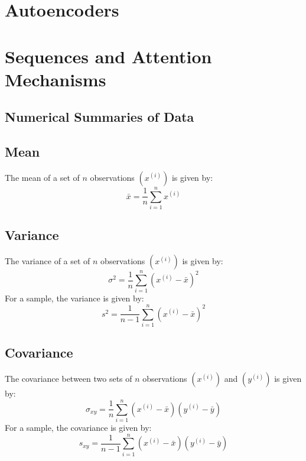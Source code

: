 \documentclass{article}
\begin{document}
\section{Autoencoders}
\section{Sequences and Attention Mechanisms}
\newpage
\begin{appendix}
    \section{Numerical Summaries of Data}\label{appendix:numerical-summaries}
    \subsection{Mean}
    The mean of a set of \(n\) observations \(\left( x^{\left( i
    \right)} \right)\) is given by:
    \begin{equation*}
        \bar{x} = \frac{1}{n} \sum_{i = 1}^n x^{\left( i \right)}
    \end{equation*}
    \subsection{Variance}
    The variance of a set of \(n\) observations \(\left( x^{\left( i
    \right)} \right)\) is given by:
    \begin{equation*}
        \sigma^2 = \frac{1}{n} \sum_{i = 1}^n {\left( x^{\left( i \right)} - \bar{x} \right)}^2
    \end{equation*}
    For a sample, the variance is given by:
    \begin{equation*}
        s^2 = \frac{1}{n - 1} \sum_{i = 1}^n {\left( x^{\left( i \right)} - \bar{x} \right)}^2
    \end{equation*}
    \subsection{Covariance}
    The covariance between two sets of \(n\) observations \(\left(
    x^{\left( i \right)} \right)\) and \(\left( y^{\left( i \right)}
    \right)\) is given by:
    \begin{equation*}
        \sigma_{xy} = \frac{1}{n} \sum_{i = 1}^n \left( x^{\left( i \right)} - \bar{x} \right) \left( y^{\left( i \right)} - \bar{y} \right)
    \end{equation*}
    For a sample, the covariance is given by:
    \begin{equation*}
        s_{xy} = \frac{1}{n - 1} \sum_{i = 1}^n \left( x^{\left( i \right)} - \bar{x} \right) \left( y^{\left( i \right)} - \bar{y} \right)
    \end{equation*}
\end{appendix}
\end{document}
